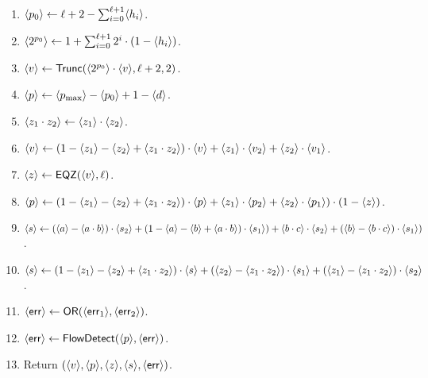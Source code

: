 \begin{enumerate}
\item $\langle p_0 \rangle \leftarrow \ell+2-\sum_{i=0}^{\ell+1} \langle h_i \rangle$.
\item $\langle 2^{p_0} \rangle \leftarrow 1+ \sum_{i=0}^{\ell+1} 2^i \cdot (1-\langle h_i \rangle)$.
\item $\langle v \rangle \leftarrow \mathsf{Trunc}(\langle 2^{p_0} \rangle \cdot \langle v \rangle,\ell+2,2)$.
\item $\langle p \rangle \leftarrow \langle p_{\max} \rangle-\langle p_0 \rangle+1-\langle d \rangle$.
\item $\langle z_1 \cdot z_2 \rangle \leftarrow \langle z_1 \rangle \cdot \langle z_2 \rangle$.
\item $\langle v \rangle \leftarrow (1-\langle z_1 \rangle-\langle z_2 \rangle +\langle z_1 \cdot z_2 \rangle) \cdot \langle v \rangle
		    + \langle z_1 \rangle \cdot \langle v_2 \rangle + \langle z_2 \rangle \cdot \langle v_1 \rangle$.
\item $\langle z \rangle \leftarrow \mathsf{EQZ}(\langle v \rangle,\ell)$.
\item $\langle p \rangle \leftarrow (1-\langle z_1 \rangle-\langle z_2 \rangle+\langle z_1 \cdot z_2 \rangle) \cdot \langle p \rangle
	+ \langle z_1 \rangle \cdot \langle p_2 \rangle 
	+ \langle z_2 \rangle \cdot \langle p_1 \rangle) \cdot (1-\langle z \rangle)$.
\item $\langle s \rangle \leftarrow (\langle a \rangle-\langle a \cdot b \rangle) \cdot \langle s_2 \rangle
	             + (1-\langle a \rangle-\langle b \rangle+\langle a \cdot b \rangle) \cdot \langle s_1 \rangle)
		     + \langle b \cdot c \rangle \cdot \langle s_2 \rangle
		     + (\langle b \rangle-\langle b \cdot c \rangle) \cdot \langle s_1 \rangle)$.
\item $\langle s \rangle \leftarrow (1-\langle z_1 \rangle-\langle z_2 \rangle+\langle z_1 \cdot z_2 \rangle) \cdot \langle s \rangle
	             + (\langle z_2 \rangle-\langle z_1 \cdot z_2 \rangle) \cdot \langle s_1 \rangle
		     + (\langle z_1 \rangle-\langle z_1 \cdot z_2 \rangle) \cdot \langle s_2 \rangle$.
\item $\langle \mathsf{err} \rangle \leftarrow \mathsf{OR}(\langle \mathsf{err}_1 \rangle,\langle \mathsf{err}_2 \rangle)$.
\item $\langle \mathsf{err} \rangle \leftarrow \mathsf{FlowDetect}(\langle p \rangle,\langle \mathsf{err} \rangle)$.
\item Return $(\langle v \rangle,\langle p \rangle,\langle z \rangle,\langle s \rangle,\langle \mathsf{err} \rangle)$.
\end{enumerate}

